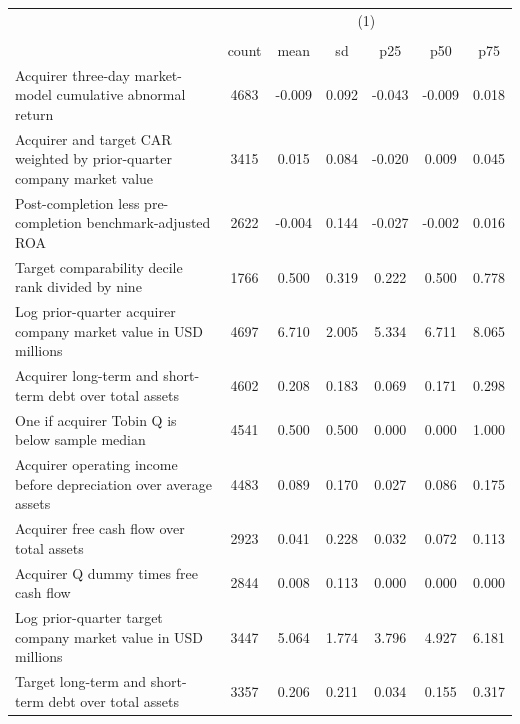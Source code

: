 {
\def\sym#1{\ifmmode^{#1}\else\(^{#1}\)\fi}
\begin{tabular}{l*{1}{cccccc}}
\hline\hline
                    &\multicolumn{6}{c}{(1)}                                                      \\
                    &\multicolumn{6}{c}{}                                                         \\
                    &       count&        mean&          sd&         p25&         p50&         p75\\
\hline
Acquirer three-day market-model cumulative abnormal return&        4683&      -0.009&       0.092&      -0.043&      -0.009&       0.018\\
Acquirer and target CAR weighted by prior-quarter company market value&        3415&       0.015&       0.084&      -0.020&       0.009&       0.045\\
Post-completion less pre-completion benchmark-adjusted ROA&        2622&      -0.004&       0.144&      -0.027&      -0.002&       0.016\\
Target comparability decile rank divided by nine&        1766&       0.500&       0.319&       0.222&       0.500&       0.778\\
Log prior-quarter acquirer company market value in USD millions&        4697&       6.710&       2.005&       5.334&       6.711&       8.065\\
Acquirer long-term and short-term debt over total assets&        4602&       0.208&       0.183&       0.069&       0.171&       0.298\\
One if acquirer Tobin Q is below sample median&        4541&       0.500&       0.500&       0.000&       0.000&       1.000\\
Acquirer operating income before depreciation over average assets&        4483&       0.089&       0.170&       0.027&       0.086&       0.175\\
Acquirer free cash flow over total assets&        2923&       0.041&       0.228&       0.032&       0.072&       0.113\\
Acquirer Q dummy times free cash flow&        2844&       0.008&       0.113&       0.000&       0.000&       0.000\\
Log prior-quarter target company market value in USD millions&        3447&       5.064&       1.774&       3.796&       4.927&       6.181\\
Target long-term and short-term debt over total assets&        3357&       0.206&       0.211&       0.034&       0.155&       0.317\\

\end{tabular}}
